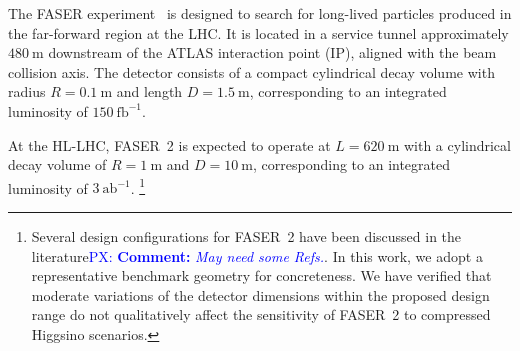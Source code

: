 \documentclass[
    prl,
    twocolumn,
    superscriptaddress,
    nofootinbib,
    amsmath, amssymb,
    aps,
    reprint,
    floatfix
]{revtex4-2}
\newcommand{\px}[1]{\textcolor{blue} {PX: {\bf Comment:} {\it #1}}}
\begin{document}
The FASER experiment~\cite{Feng:2022inv, FASER:2018eoc} is designed to search for long-lived particles produced in the far-forward region at the LHC. 
It is located in a service tunnel approximately $480~\mathrm{m}$ downstream of the ATLAS interaction point (IP), aligned with the beam collision axis. 
The detector consists of a compact cylindrical decay volume with radius $R = 0.1~\mathrm{m}$ and length $D = 1.5~\mathrm{m}$, corresponding to an integrated luminosity of $150~\mathrm{fb}^{-1}$.  

At the HL-LHC, FASER~2 is expected to operate at $L=620~\mathrm{m}$ with a cylindrical decay volume of $R=1~\mathrm{m}$ and $D=10~\mathrm{m}$, corresponding to an integrated luminosity of $3~\mathrm{ab}^{-1}$.%
\footnote{Several design configurations for FASER~2 have been discussed in the literature\px{May need some Refs.}. In this work, we adopt a representative benchmark geometry for concreteness. We have verified that moderate variations of the detector dimensions within the proposed design range do not qualitatively affect the sensitivity of FASER~2 to compressed Higgsino scenarios.}
\end{document}
